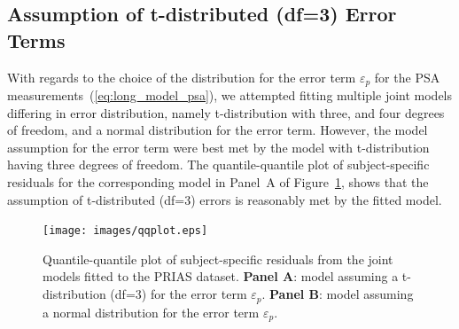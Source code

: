 
\clearpage
\subsection{Assumption of t-distributed (df=3) Error Terms}
\label{subsec:t-dist-assumption}
With regards to the choice of the distribution for the error term $\varepsilon_p$ for the PSA measurements~(\ref{eq:long_model_psa}), we attempted fitting multiple joint models differing in error distribution, namely t-distribution with three, and four degrees of freedom, and a normal distribution for the error term. However, the model assumption for the error term were best met by the model with t-distribution having three degrees of freedom. The quantile-quantile plot of subject-specific residuals for the corresponding model in Panel~A of Figure~\ref{fig:qqplot}, shows that the assumption of t-distributed (df=3) errors is reasonably met by the fitted model. 

\begin{figure}[!htb]
\centerline{\texttt{[image: images/qqplot.eps]}}
\caption{Quantile-quantile plot of subject-specific residuals from the joint models fitted to the PRIAS dataset. \textbf{Panel A}: model assuming a t-distribution (df=3) for the error term $\varepsilon_p$. \textbf{Panel B}: model assuming a normal distribution for the error term $\varepsilon_p$.}
\label{fig:qqplot}
\end{figure}

